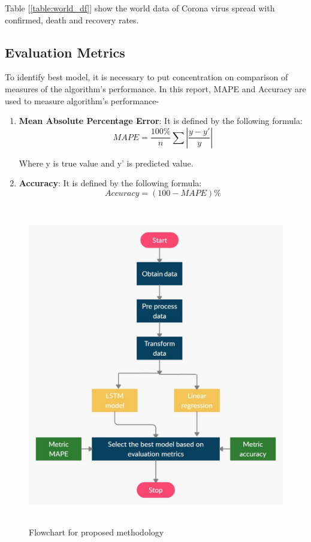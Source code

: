 Table [\ref{table:world_df}] show the world data of Corona virus spread with
confirmed, death and recovery rates.

\subsection{Evaluation Metrics}

To identify best model, it is necessary to put concentration on comparison of measures of
the algorithm’s performance. In this report, MAPE and Accuracy are used to
measure algorithm's performance-

\begin{enumerate}
	\item \textbf{Mean Absolute Percentage Error}: It is defined by
		the following formula:
		\begin{equation}\label{eqn1}
			MAPE = \frac{100\%}{n} \sum \left \vert \frac{y-y\prime}{y}
			\right \vert
		\end{equation}

		Where y is true value and y' is predicted value.

	\item \textbf{Accuracy}: It is defined by the following formula:
		\begin{equation}\label{eqn2}
			Accuracy = (100 - MAPE)\%
		\end{equation}

\end{enumerate}


\begin{figure}[!ht]
	  \centering
	  \includegraphics[height=14cm]{images/method.jpg}
	  \caption{Flowchart for proposed methodology}
	  \label{fig:method_flow}
\end{figure}

